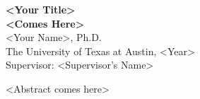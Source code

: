 \vspace*{2em}
\begin{center}
    {\large\textbf{<Your Title>}}\\[0.2em]
    {\large\textbf{<Comes Here>}}
    \\[2.5em]
    <Your Name>, Ph.D.\\
    The University of Texas at Austin, <Year>\\[2.5em]
    Supervisor: <Supervisor's Name>
\end{center}
\vspace{2.5em}

<Abstract comes here>

\clearpage